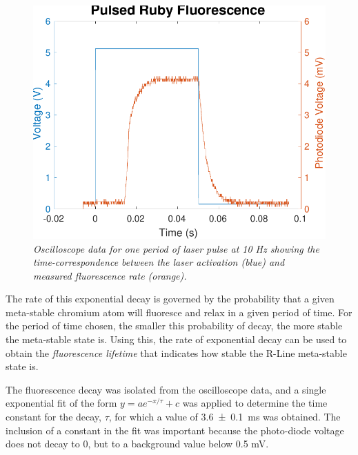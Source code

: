 \documentclass[11pt, a4paper, twocolumn]{article}
\begin{document}
\begin{figure}[]
\includegraphics[width=\linewidth]{fluorescencePeriod.pdf}
\caption{\textit{Oscilloscope data for one period of laser pulse at 10 Hz showing the time-correspondence between the laser activation (blue) and measured fluorescence rate (orange).}}
\label{fig:fluorescencePeriod}
\end{figure}

The rate of this exponential decay is governed by the probability that a given meta-stable chromium atom will fluoresce and relax in a given period of time. For the period of time chosen, the smaller this probability of decay, the more stable the meta-stable state is. Using this, the rate of exponential decay can be used to obtain the \textit{fluorescence lifetime} that indicates how stable the R-Line meta-stable state is.

The fluorescence decay was isolated from the oscilloscope data, and a single exponential fit of the form $y = ae^{-x/\tau} + c$ was applied to determine the time constant for the decay, $\tau$, for which a value of \SI{3.6\pm0.1}{\ms} was obtained. The inclusion of a constant in the fit was important because the photo-diode voltage does not decay to 0, but to a background value below 0.5 mV.
\end{document}
